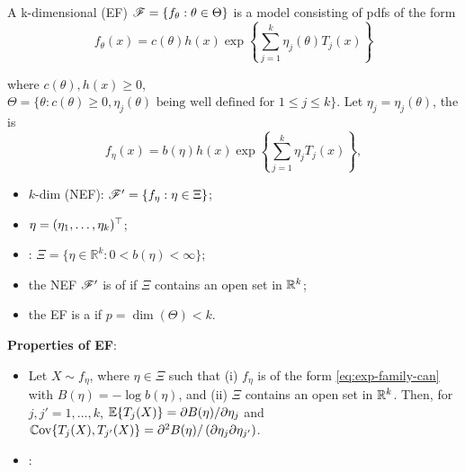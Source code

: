 \documentclass[10pt,a4paper]{book}
\begin{document}
\begin{defbox}
	\begin{definition}\label{def:exp-family}
		A k-dimensional  (EF) $\mathscr{F}=\{f_\theta:\theta\in\Theta\}$ is a model consisting of pdfs of the form
		\begin{equation}\label{eq:exp-family-pdf}
			f_\theta(x)=c(\theta)h(x)\exp\left\{\sum_{j=1}^k\eta_j(\theta)T_j(x)\right\}
		\end{equation}
	\end{definition}
	where $c(\theta),h(x)\geq 0$, $\Theta=\{\theta:c(\theta)\geq 0, \eta_j(\theta) \text{ being well defined for } 1\leq j\leq k\}$. Let $\eta_j=\eta_j(\theta)$, the  is 
	\begin{equation}\label{eq:exp-family-can}
		f_\eta(x)=b(\eta)h(x)\exp\left\{\sum_{j=1}^k\eta_jT_j(x)\right\},
	\end{equation}
	\begin{itemize}[itemsep=2pt,topsep=0pt,parsep=0pt]
		\item $k$-dim  (NEF): $\mathscr{F}'=\{f_{\eta}:\eta\in \Xi\}$; 
		\item {} $\eta=(\eta_1,\ldots,\eta_k)^\top$;
		\item {}: $\Xi=\{\eta\in\mathbb{R}^k:0<b(\eta)<\infty\}$; 
		\item the NEF $\mathscr{F}'$ is of  if $\Xi$ contains an open set in $\mathbb R^k$;
		\item the EF is a  if $p=\dim(\Theta)<k$.
	\end{itemize}
\end{defbox}
\textbf{Properties of EF}:
\begin{itemize}[itemsep=2pt,topsep=0pt,parsep=0pt]
	\item Let $X\sim f_{\eta}$, where $\eta\in\Xi$ such that (i) $f_{\eta}$ is of the form \eqref{eq:exp-family-can} with $B(\eta)=-\log b(\eta)$, and (ii) $\Xi$ contains an open set in $\mathbb R^k$. Then, for $j,j'=1,\ldots,k$, $\mathbb E\{T_j(X)\}={\partial B(\eta)}/{\partial\eta_j}$ and $\mathbb{C}\mathrm{ov}\{T_j(X),T_{j'}(X)\}={\partial^2B(\eta)}/\left( {\partial\eta_j\partial\eta_{j'}}\right)$.  
	\item {}:
\end{itemize}
\end{document}
